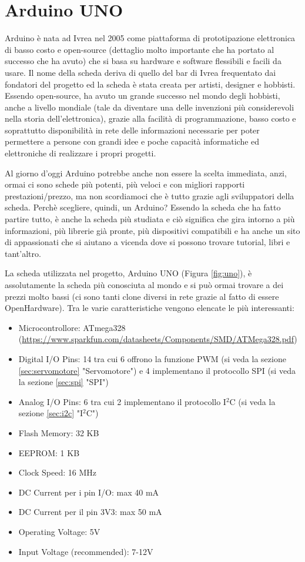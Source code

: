\documentclass[12pt]{report}
\begin{document}
%
\section{Arduino UNO}
%

Arduino\cite{arduino_storia} è nata ad Ivrea nel 2005 come piattaforma di prototipazione elettronica di basso costo e open-source (dettaglio molto importante che ha portato al successo che ha avuto) che si basa su hardware e software flessibili e facili da usare. Il nome della scheda deriva di quello del bar di Ivrea frequentato dai fondatori del progetto ed la scheda è stata creata per artisti, designer e hobbisti. Essendo open-source, ha avuto un grande successo nel mondo degli hobbisti, anche a livello mondiale (tale da diventare una delle invenzioni più considerevoli nella storia dell'elettronica), grazie alla facilità di programmazione, basso costo e soprattutto disponibilità in rete delle informazioni necessarie per poter permettere a persone con grandi idee e poche capacità informatiche ed elettroniche di realizzare i propri progetti. 

Al giorno d'oggi Arduino potrebbe anche non essere la scelta immediata, anzi, ormai ci sono schede più potenti, più veloci e con migliori rapporti prestazioni/prezzo, ma non scordiamoci che è tutto grazie agli sviluppatori della scheda. Perchè scegliere, quindi, un Arduino? Essendo la scheda che ha fatto partire tutto, è anche la scheda più studiata e ciò significa che gira intorno a più informazioni, più librerie già pronte, più dispositivi compatibili e ha anche un sito di appassionati che si aiutano a vicenda dove si possono trovare tutorial, libri e tant'altro.

La scheda utilizzata nel progetto, Arduino UNO (Figura \ref{fig:uno}), è assolutamente la scheda più conosciuta al mondo e si può ormai trovare a dei prezzi molto bassi (ci sono tanti clone diversi in rete grazie al fatto di essere OpenHardware). Tra le varie caratteristiche vengono elencate le più interessanti:

\begin{itemize}
	\item Microcontrollore: ATmega328 (\url{https://www.sparkfun.com/datasheets/Components/SMD/ATMega328.pdf})
	\item Digital I/O Pins: 14 tra cui 6 offrono la funzione PWM (si veda la sezione \ref{sec:servomotore} "Servomotore") e 4 implementano il protocollo SPI (si veda la sezione \ref{sec:spi} "SPI")
	\item Analog I/O Pins: 6 tra cui 2 implementano il protocollo I$^2$C (si veda la sezione \ref{sec:i2c} "I$^2$C")
	\item Flash Memory: 32 KB
	\item EEPROM: 1 KB
	\item Clock Speed: 16 MHz
	\item DC Current per i pin I/O: max 40 mA
	\item DC Current per il pin 3V3: max 50 mA
	\item Operating Voltage: 5V
	\item Input Voltage (recommended): 7-12V
\end{itemize}
\end{document}
